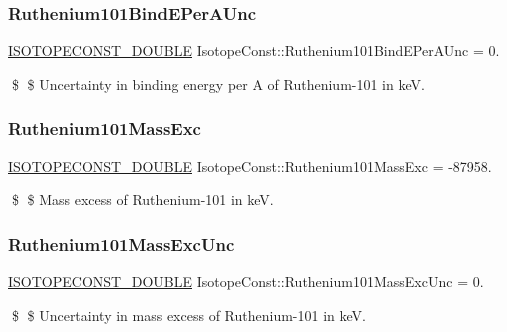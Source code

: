 \subsubsection{\texorpdfstring{Ruthenium101\+Bind\+E\+Per\+A\+Unc}{Ruthenium101BindEPerAUnc}}
{\footnotesize\ttfamily \mbox{\hyperlink{group___isotope_const-_macros_ga8f45a7272ce02c0b4c65c44636ed719a}{I\+S\+O\+T\+O\+P\+E\+C\+O\+N\+S\+T\+\_\+\+D\+O\+U\+B\+LE}} Isotope\+Const\+::\+Ruthenium101\+Bind\+E\+Per\+A\+Unc = 0.}

\$ \$ Uncertainty in binding energy per A of Ruthenium-\/101 in keV. \mbox{\label{group___isotope_const-_ruthenium-_ru101_gabee4f74a338e36b07565dd73ab6d5fe9}} 
\subsubsection{\texorpdfstring{Ruthenium101\+Mass\+Exc}{Ruthenium101MassExc}}
{\footnotesize\ttfamily \mbox{\hyperlink{group___isotope_const-_macros_ga8f45a7272ce02c0b4c65c44636ed719a}{I\+S\+O\+T\+O\+P\+E\+C\+O\+N\+S\+T\+\_\+\+D\+O\+U\+B\+LE}} Isotope\+Const\+::\+Ruthenium101\+Mass\+Exc = -\/87958.}

\$ \$ Mass excess of Ruthenium-\/101 in keV. \mbox{\label{group___isotope_const-_ruthenium-_ru101_ga51c7f01b38e86c46f5aa85947bf52648}} 
\subsubsection{\texorpdfstring{Ruthenium101\+Mass\+Exc\+Unc}{Ruthenium101MassExcUnc}}
{\footnotesize\ttfamily \mbox{\hyperlink{group___isotope_const-_macros_ga8f45a7272ce02c0b4c65c44636ed719a}{I\+S\+O\+T\+O\+P\+E\+C\+O\+N\+S\+T\+\_\+\+D\+O\+U\+B\+LE}} Isotope\+Const\+::\+Ruthenium101\+Mass\+Exc\+Unc = 0.}

\$ \$ Uncertainty in mass excess of Ruthenium-\/101 in keV. \mbox{\label{group___isotope_const-_ruthenium-_ru101_ga9536cf62a1334a2b205968becc4e8b31}} 
